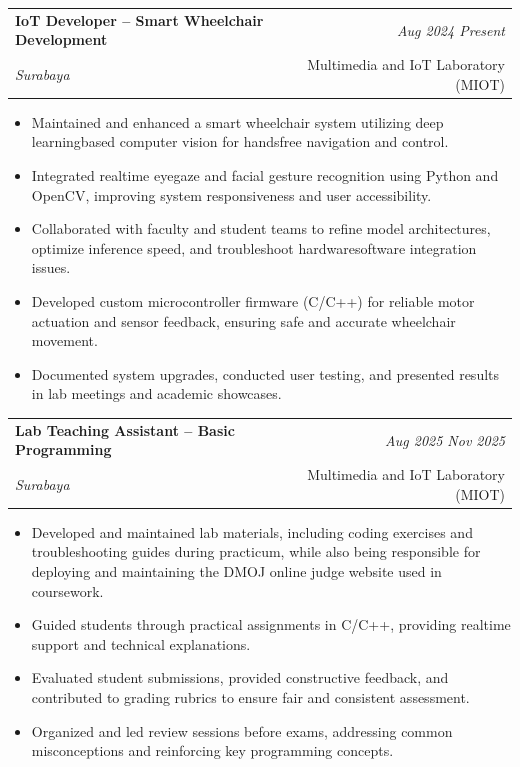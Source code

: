 \documentclass[a4paper,11pt]{article}
\makeatletter
\newcommand{\resumeSubheading}[4]{
\vspace{0.5mm}\item
    \begin{tabular*}{0.98\textwidth}[t]{l@{\extracolsep{\fill}}r}
        \textbf{#1} & \textit{\footnotesize{#4}} \\
        \textit{\footnotesize{#3}} &  \footnotesize{#2}\\
    \end{tabular*}
    \vspace{-2.4mm}
}
\newcommand{\resumeItemListStart}{\begin{justify}\begin{itemize}[leftmargin=3ex, rightmargin=2ex, noitemsep,labelsep=1.2mm,itemsep=0mm]\small}
\newcommand{\resumeItemListEnd}{\end{itemize}\end{justify}\vspace{-2mm}}
\makeatother
\begin{document}
\vspace{-2mm}
\resumeSubheading
{IoT Developer – Smart Wheelchair Development}{Multimedia and IoT Laboratory (MIOT)}
{Surabaya}{Aug 2024 \- Present}
\resumeItemListStart
\item {Maintained and enhanced a smart wheelchair system utilizing deep learning\-based computer vision for hands\-free navigation and control.}
\item {Integrated real\-time eye\-gaze and facial gesture recognition using Python and OpenCV, improving system responsiveness and user accessibility.}
\item {Collaborated with faculty and student teams to refine model architectures, optimize inference speed, and troubleshoot hardware\-software integration issues.}
\item {Developed custom microcontroller firmware (C/C++) for reliable motor actuation and sensor feedback, ensuring safe and accurate wheelchair movement.}
\item {Documented system upgrades, conducted user testing, and presented results in lab meetings and academic showcases.}
\resumeItemListEnd

\resumeSubheading
{Lab Teaching Assistant – Basic Programming}{Multimedia and IoT Laboratory (MIOT)}
{Surabaya}{Aug 2025 \- Nov 2025}
\resumeItemListStart
\item {Developed and maintained lab materials, including coding exercises and troubleshooting guides during practicum, while also being responsible for deploying and maintaining the DMOJ online judge website used in coursework.}
\item {Guided students through practical assignments in C/C++, providing real\-time support and technical explanations.}
\item {Evaluated student submissions, provided constructive feedback, and contributed to grading rubrics to ensure fair and consistent assessment.}
\item {Organized and led review sessions before exams, addressing common misconceptions and reinforcing key programming concepts.}
\resumeItemListEnd
\vspace{-2mm}
\end{document}
